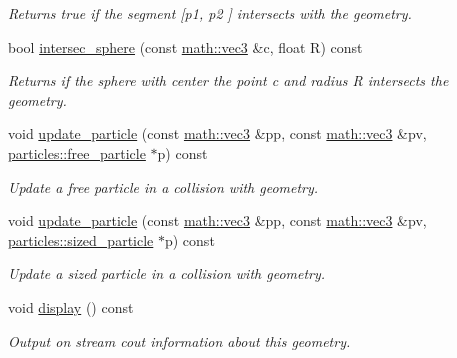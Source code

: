 \begin{DoxyCompactItemize}
\begin{DoxyCompactList}\small\item\em Returns true if the segment \mbox{[}{\itshape p1}, {\itshape p2} \mbox{]} intersects with the geometry. \end{DoxyCompactList}\item 
bool \hyperlink{classphysim_1_1geometry_1_1rectangle_a20183873554b35d84f5f87406e89076e}{intersec\+\_\+sphere} (const \hyperlink{structphysim_1_1math_1_1vec3}{math\+::vec3} \&c, float R) const
\begin{DoxyCompactList}\small\item\em Returns if the sphere with center the point {\itshape c} and radius {\itshape R} intersects the geometry. \end{DoxyCompactList}\item 
void \hyperlink{classphysim_1_1geometry_1_1rectangle_a86072bd1493b9136841aca97f33d2737}{update\+\_\+particle} (const \hyperlink{structphysim_1_1math_1_1vec3}{math\+::vec3} \&pp, const \hyperlink{structphysim_1_1math_1_1vec3}{math\+::vec3} \&pv, \hyperlink{classphysim_1_1particles_1_1free__particle}{particles\+::free\+\_\+particle} $\ast$p) const
\begin{DoxyCompactList}\small\item\em Update a free particle in a collision with geometry. \end{DoxyCompactList}\item 
void \hyperlink{classphysim_1_1geometry_1_1rectangle_a85054e17383f27439fb936302558e8e9}{update\+\_\+particle} (const \hyperlink{structphysim_1_1math_1_1vec3}{math\+::vec3} \&pp, const \hyperlink{structphysim_1_1math_1_1vec3}{math\+::vec3} \&pv, \hyperlink{classphysim_1_1particles_1_1sized__particle}{particles\+::sized\+\_\+particle} $\ast$p) const
\begin{DoxyCompactList}\small\item\em Update a sized particle in a collision with geometry. \end{DoxyCompactList}\item 
\mbox{\label{classphysim_1_1geometry_1_1rectangle_a16ca0c920767dcfcd4ae98f3f01fc433}} 
void \hyperlink{classphysim_1_1geometry_1_1rectangle_a16ca0c920767dcfcd4ae98f3f01fc433}{display} () const
\begin{DoxyCompactList}\small\item\em Output on stream {\itshape cout} information about this geometry. \end{DoxyCompactList}\end{DoxyCompactItemize}

